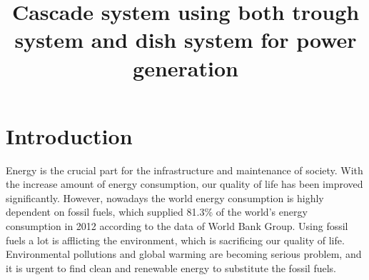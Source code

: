 \documentclass{article}
\begin{document}
\title{Cascade system using both trough system and dish system for power generation}
\date{}
\author{}
\maketitle


\newpage{}

\section{Introduction}

Energy is the crucial part for the infrastructure and maintenance of  society. With the increase amount of energy consumption, our quality of life has been improved significantly. However, nowadays the world energy consumption is highly dependent on fossil fuels, which supplied 81.3\% of the world's energy consumption in 2012 according to the data of World Bank Group. Using fossil fuels a lot is afflicting the environment, which is sacrificing our quality of life. Environmental pollutions and global warming are becoming serious problem, and it is urgent to find clean and renewable energy to substitute the fossil fuels.
\end{document}
